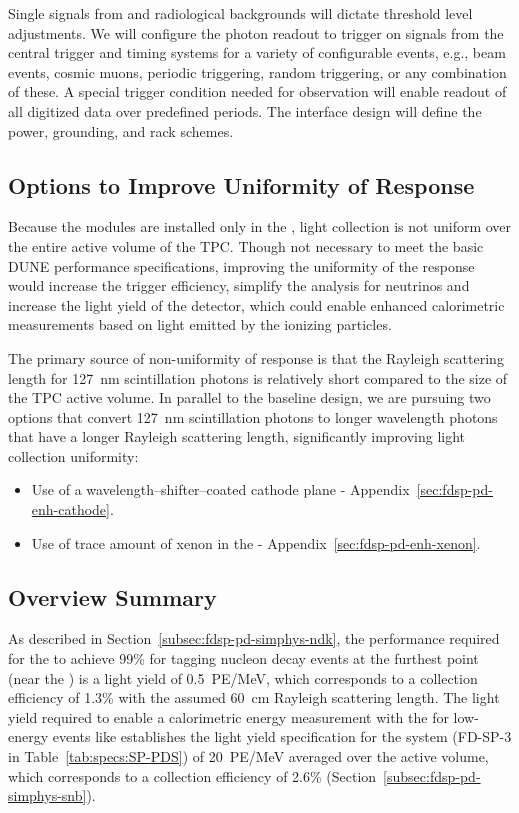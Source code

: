 Single \phel signals from  and radiological backgrounds will dictate threshold level adjustments.
We will configure the photon readout to trigger on signals from the central trigger and timing systems for a variety of configurable events, e.g., beam events, cosmic
muons, periodic triggering, random triggering, or any combination of
these. A special trigger condition needed for  observation will enable readout of all digitized data over predefined periods.
The interface design will define the power, grounding, and rack schemes.


\subsection{Options to Improve Uniformity of Response} 

Because the  modules are installed only in the , light collection is not uniform over the entire active volume of the TPC. 
Though not necessary to meet the basic DUNE performance specifications, improving the uniformity of the response would increase the trigger efficiency, simplify the analysis for  neutrinos and increase the light yield of the detector, which could enable enhanced calorimetric measurements based on light emitted by the ionizing particles.

The primary source of non-uniformity of response is that the Rayleigh scattering length for \SI{127}{nm} scintillation photons is relatively short compared to the size of the TPC active volume.   
In parallel to the baseline design, we are pursuing two options that convert \SI{127}{nm} scintillation photons to longer wavelength photons that have a longer Rayleigh scattering length, significantly improving light collection uniformity:
\begin{itemize}
\item Use of a wavelength--shifter--coated cathode plane - Appendix~\ref{sec:fdsp-pd-enh-cathode}.
\item Use of trace amount of xenon in the  - Appendix~\ref{sec:fdsp-pd-enh-xenon}.
\end{itemize}


\subsection{Overview Summary} 
\label{sec:fdsp-pd-ov-summ}

As described in Section~\ref{subsec:fdsp-pd-simphys-ndk}, the performance required for the  to achieve 99\% for tagging nucleon decay events at the furthest point (near the ) is a light yield of \SI{0.5}{PE/MeV}, which corresponds to a collection efficiency of 1.3\% with the assumed \SI{60}{cm} Rayleigh scattering length. The light yield required to enable a calorimetric energy measurement with the  for low-energy events like  establishes the light yield specification for the system (FD-SP-3 in Table~\ref{tab:specs:SP-PDS}) of \SI{20}{PE/MeV} averaged over the active volume, which corresponds to a collection efficiency of 2.6\% (Section~\ref{subsec:fdsp-pd-simphys-snb}).

